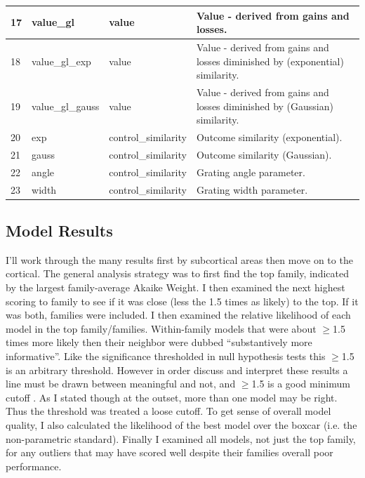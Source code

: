 \documentclass[doc,12pt]{apa}        %
\begin{document}
\begin{center}
\begin{longtable}{ | l | l | l | p{6cm} |}
        17 & value\_gl & value & Value - derived from gains and losses. \\ \hline
        18 & value\_gl\_exp & value & Value - derived from gains and losses diminished by (exponential) similarity. \\ \hline
        19 & value\_gl\_gauss & value & Value - derived from gains and losses diminished by (Gaussian) similarity. \\ \hline 
        20 & exp & control\_similarity & Outcome similarity (exponential). \\ \hline
        21 & gauss & control\_similarity & Outcome similarity (Gaussian). \\ \hline
        22 & angle & control\_similarity & Grating angle parameter. \\ \hline
        23 &width & control\_similarity & Grating width parameter. \\ \hline
    \end{longtable}
\end{center}


\subsection{Model Results}
\label{sub:modelresults}
I'll work through the many results first by subcortical areas then move on to the cortical.  The general analysis strategy was to first find the top family, indicated by the largest family-average Akaike Weight.  I then examined the next highest scoring to family to see if it was close (less the 1.5 times as likely) to the top.  If it was both, families were included.  I then examined the relative likelihood of each model in the top family/families.  Within-family models that were about $\ge$1.5 times more likely then their neighbor were dubbed ``substantively more informative''.  Like the significance thresholded in null hypothesis tests this $\ge$1.5 is an arbitrary threshold.  However in order discuss and interpret these results a line must be drawn between meaningful and not, and $\ge$1.5 is a good minimum cutoff \cite{Anderson:2000p9475, Forster:2000p9623}.  As I stated though at the outset, more than one model may be right.  Thus the threshold was treated a loose cutoff.  To get sense of overall model quality, I also calculated the likelihood of the best model over the boxcar (i.e. the non-parametric standard).  Finally I examined all models, not just the top family, for any outliers that may have scored well despite their families overall poor performance.
\end{document}
